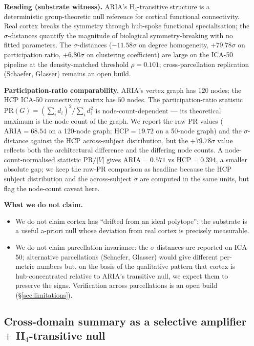 \textbf{Reading (substrate witness).} ARIA's H$_4$-transitive
structure is a deterministic group-theoretic null reference for
cortical functional connectivity. Real cortex breaks the symmetry
through hub-spoke functional specialisation; the $\sigma$-distances
quantify the magnitude of biological symmetry-breaking with no
fitted parameters. The $\sigma$-distances ($-11.58\sigma$ on degree
homogeneity, $+79.78\sigma$ on participation ratio, $+6.80\sigma$ on
clustering coefficient) are large on the ICA-50 pipeline at the
density-matched threshold $\rho = 0.101$; cross-parcellation
replication (Schaefer, Glasser) remains an open build.

\textbf{Participation-ratio comparability.} ARIA's vertex graph has
$120$ nodes; the HCP ICA-50 connectivity matrix has $50$ nodes. The
participation-ratio statistic
$\mathrm{PR}(G) = (\sum_{i} d_{i})^{2} / \sum_{i} d_{i}^{2}$ is
node-count-dependent — its theoretical maximum is the node count of
the graph. We report the raw $\mathrm{PR}$ values
($\mathrm{ARIA}=68.54$ on a 120-node graph; $\mathrm{HCP}=19.72$ on a
50-node graph) and the $\sigma$-distance against the HCP
across-subject distribution, but the $+79.78\sigma$ value reflects
both the architectural difference and the differing node counts. A
node-count-normalised statistic
$\mathrm{PR}/|V|$ gives $\mathrm{ARIA}=0.571$ vs $\mathrm{HCP}=0.394$,
a smaller absolute gap; we keep the raw-PR comparison as headline
because the HCP subject distribution and the across-subject
$\sigma$ are computed in the same units, but flag the node-count
caveat here.

\textbf{What we do not claim.}
\begin{itemize}\itemsep=2pt
\item We do not claim cortex has ``drifted from an ideal polytope'';
  the substrate is a useful a-priori null whose deviation from real
  cortex is precisely measurable.
\item We do not claim parcellation invariance: the $\sigma$-distances
  are reported on ICA-50; alternative parcellations (Schaefer,
  Glasser) would give different per-metric numbers but, on the
  basis of the qualitative pattern that cortex is hub-concentrated
  relative to ARIA's transitive null, we expect them to preserve the
  signs. Verification across parcellations is an open build
  (\S\ref{sec:limitations}).
\end{itemize}

\subsection{Cross-domain summary as a selective amplifier
            \texorpdfstring{$+$}{+} H$_4$-transitive null}

